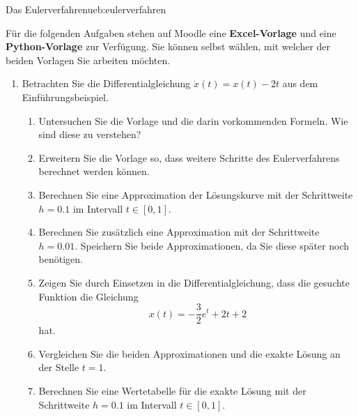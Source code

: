 \begin{ueb}{Das Eulerverfahren}{ueb:eulerverfahren}

    Für die folgenden Aufgaben stehen auf Moodle eine
    \textbf{Excel-Vorlage} und eine \textbf{Python-Vorlage}
    zur Verfügung. Sie können selbst wählen, mit welcher
    der beiden Vorlagen Sie arbeiten möchten.

    \begin{enumerate}
        \item Betrachten Sie die Differentialgleichung
              \(\dot{x}(t)=x(t)-2t\) aus dem Einführungsbeispiel.

              \begin{enumerate}
                  \item Untersuchen Sie die Vorlage und die darin vorkommenden Formeln.
                        Wie sind diese zu verstehen?

                  \item Erweitern Sie die Vorlage so, dass
                        weitere Schritte des Eulerverfahrens
                        berechnet werden können.

                  \item Berechnen Sie eine Approximation der
                        Lösungskurve mit der Schrittweite \(h=0.1\)
                        im Intervall \(t\in[0,1]\).

                  \item Berechnen Sie zusätzlich eine Approximation
                        mit der Schrittweite \(h=0.01\).
                        Speichern Sie beide Approximationen,
                        da Sie diese später noch benötigen.

                  \item Zeigen Sie durch Einsetzen in die
                        Differentialgleichung, dass die gesuchte
                        Funktion die Gleichung
                        \[
                            x(t)=-\frac{3}{2}e^t+2t+2
                        \]
                        hat.

                  \item Vergleichen Sie die beiden Approximationen
                        und die exakte Lösung an der Stelle \(t=1\).

                  \item Berechnen Sie eine Wertetabelle für die
                        exakte Lösung mit der Schrittweite \(h=0.1\)
                        im Intervall \(t\in[0,1]\).


\end{enumerate}
\end{enumerate}
\end{ueb}
